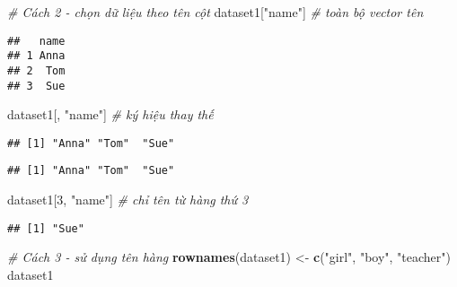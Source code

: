 \documentclass[
]{article}
\newenvironment{Shaded}{\begin{snugshade}}{\end{snugshade}}
\newcommand{\CommentTok}[1]{\textcolor[rgb]{0.56,0.35,0.01}{\textit{#1}}}
\newcommand{\DecValTok}[1]{\textcolor[rgb]{0.00,0.00,0.81}{#1}}
\newcommand{\FunctionTok}[1]{\textcolor[rgb]{0.13,0.29,0.53}{\textbf{#1}}}
\newcommand{\NormalTok}[1]{#1}
\newcommand{\OtherTok}[1]{\textcolor[rgb]{0.56,0.35,0.01}{#1}}
\newcommand{\SpecialCharTok}[1]{\textcolor[rgb]{0.81,0.36,0.00}{\textbf{#1}}}
\newcommand{\StringTok}[1]{\textcolor[rgb]{0.31,0.60,0.02}{#1}}
\begin{document}
\begin{Shaded}
\begin{Highlighting}[]
\CommentTok{\# Cách 2 {-} chọn dữ liệu theo tên cột}
\NormalTok{dataset1[}\StringTok{"name"}\NormalTok{]  }\CommentTok{\# toàn bộ vector tên}
\end{Highlighting}
\end{Shaded}

\begin{verbatim}
##   name
## 1 Anna
## 2  Tom
## 3  Sue
\end{verbatim}

\begin{Shaded}
\begin{Highlighting}[]
\NormalTok{dataset1[, }\StringTok{"name"}\NormalTok{]  }\CommentTok{\# ký hiệu thay thế}
\end{Highlighting}
\end{Shaded}

\begin{verbatim}
## [1] "Anna" "Tom"  "Sue"
\end{verbatim}

\begin{Shaded}
\end{Shaded}

\begin{verbatim}
## [1] "Anna" "Tom"  "Sue"
\end{verbatim}

\begin{Shaded}
\begin{Highlighting}[]
\NormalTok{dataset1[}\DecValTok{3}\NormalTok{, }\StringTok{"name"}\NormalTok{]  }\CommentTok{\# chỉ tên từ hàng thứ 3}
\end{Highlighting}
\end{Shaded}

\begin{verbatim}
## [1] "Sue"
\end{verbatim}

\begin{Shaded}
\begin{Highlighting}[]
\CommentTok{\# Cách 3 {-} sử dụng tên hàng}
\FunctionTok{rownames}\NormalTok{(dataset1) }\OtherTok{\textless{}{-}} \FunctionTok{c}\NormalTok{(}\StringTok{"girl"}\NormalTok{, }\StringTok{"boy"}\NormalTok{, }\StringTok{"teacher"}\NormalTok{)}
\NormalTok{dataset1}
\end{Highlighting}
\end{Shaded}
\end{document}

